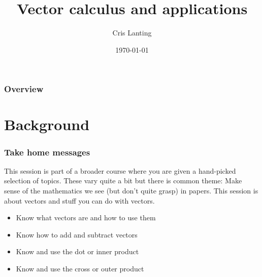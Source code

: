 \documentclass{beamer}
\title[Vectors and other useful stuf]{Vector calculus and applications} %
\author{Cris Lanting} %
\institute[UMCG] %
{
University Medical Center Groningen \\ %
Dept. of Otorhinolaryngology\\
\medskip
\textit{c.p.lanting@umcg.nl\\
www.
} %
}
\date{\today} %
\begin{document}
\begin{frame}
\titlepage %
\end{frame}

\begin{frame}
\frametitle{Overview} %
\tableofcontents %
\end{frame}


\section{Background} %

\begin{frame}
\frametitle{Take home messages}
This session is part of a broader course where you are given a hand-picked selection of topics. These vary quite a bit but there is common theme:
Make sense of the mathematics we see (but don't quite grasp) in papers. This session is about vectors and stuff you can do with vectors.\\
\begin{itemize}
\item Know what vectors are and how to use them
\item Know how to add and subtract vectors
\item Know and use the dot or inner product
\item Know and use the cross or outer product
\end{itemize}
\end{frame}
\end{document}
